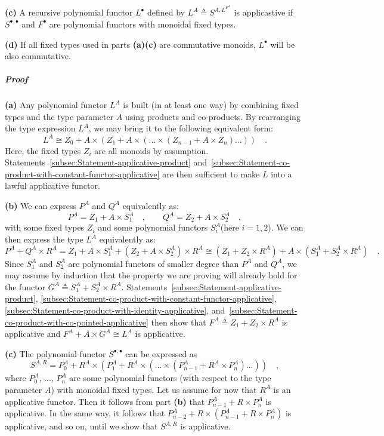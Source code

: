 \textbf{(c)} A recursive polynomial functor $L^{\bullet}$ defined
by $L^{A}\triangleq S^{A,L^{F^{A}}}$ is applicastive if $S^{\bullet,\bullet}$
and $F^{\bullet}$ are polynomial functors with monoidal fixed types.

\textbf{(d)} If all fixed types used in parts \textbf{(a)}\textendash \textbf{(c)}
are commutative monoids, $L^{\bullet}$ will be also commutative.

\subparagraph{Proof}

\textbf{(a)} Any polynomial functor $L^{A}$ is built (in at least
one way) by combining fixed types and the type parameter $A$ using
products and co-products. By rearranging the type expression $L^{A}$,
we may bring it to the following equivalent form:
\[
L^{A}\cong Z_{0}+A\times(Z_{1}+A\times(...\times(Z_{n-1}+A\times Z_{n})...))\quad.
\]
Here, the fixed types $Z_{i}$ are all monoids by assumption. Statements~\ref{subsec:Statement-applicative-product}
and~\ref{subsec:Statement-co-product-with-constant-functor-applicative}
are then sufficient to make $L$ into a lawful applicative functor. 

\textbf{(b)} We can express $P^{A}$ and $Q^{A}$ equivalently as:
\[
P^{A}=Z_{1}+A\times S_{1}^{A}\quad,\quad\quad Q^{A}=Z_{2}+A\times S_{2}^{A}\quad,
\]
with some fixed types $Z_{i}$ and some polynomial functors $S_{i}^{A}$(here
$i=1,2$). We can then express the type $L^{A}$ equivalently as:
\[
P^{A}+Q^{A}\times R^{A}=Z_{1}+A\times S_{1}^{A}+(Z_{2}+A\times S_{2}^{A})\times R^{A}\cong(Z_{1}+Z_{2}\times R^{A})+A\times(S_{1}^{A}+S_{2}^{A}\times R^{A})\quad.
\]
Since $S_{1}^{A}$ and $S_{2}^{A}$ are polynomial functors of smaller
degree than $P^{A}$ and $Q^{A}$, we may assume by induction that
the property we are proving will already hold for the functor $G^{A}\triangleq S_{1}^{A}+S_{2}^{A}\times R^{A}$.
Statements~\ref{subsec:Statement-applicative-product}, \ref{subsec:Statement-co-product-with-constant-functor-applicative},
\ref{subsec:Statement-co-product-with-identity-applicative}, and~\ref{subsec:Statement-co-product-with-co-pointed-applicative}
then show that $F^{A}\triangleq Z_{1}+Z_{2}\times R^{A}$ is applicative
and $F^{A}+A\times G^{A}\cong L^{A}$ is applicative.

\textbf{(c)} The polynomial functor $S^{\bullet,\bullet}$ can be
expressed as
\[
S^{A,R}=P_{0}^{A}+R^{A}\times(P_{1}^{A}+R^{A}\times(...\times(P_{n-1}^{A}+R^{A}\times P_{n}^{A})...))\quad,
\]
where $P_{0}^{A}$, ..., $P_{n}^{A}$ are some polynomial functors
(with respect to the type parameter $A$) with monoidal fixed types.
Let us assume for now that $R^{A}$ is an applicative functor. Then
it follows from part \textbf{(b)} that $P_{n-1}^{A}+R\times P_{n}^{A}$
is applicative. In the same way, it follows that $P_{n-2}^{A}+R\times(P_{n-1}^{A}+R\times P_{n}^{A})$
is applicative, and so on, until we show that $S^{A,R}$ is applicative.

